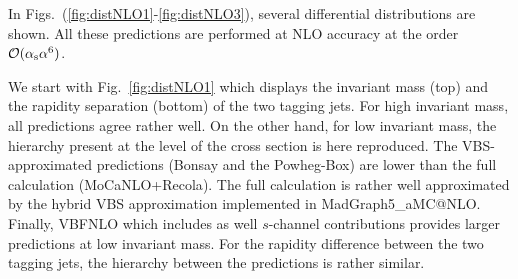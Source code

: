 In Figs.~(\ref{fig:distNLO1}-\ref{fig:distNLO3}), several differential distributions are shown.
All these predictions are performed at NLO accuracy at the order $\mathcal{O}(\alpha_{\rm s}\alpha^6)$.

We start with Fig.~\ref{fig:distNLO1} which displays the invariant mass (top) and the rapidity separation (bottom) of the two tagging jets.
For high invariant mass, all predictions agree rather well.
On the other hand, for low invariant mass, the hierarchy present at the level of the cross section is here reproduced.
The VBS-approximated predictions ({\sc Bonsay} and the {\sc Powheg-Box}) are lower than the full calculation ({\sc MoCaNLO}+{\sc Recola}).
The full calculation is rather well approximated by the hybrid VBS approximation implemented in {\sc MadGraph5\_aMC\-@NLO}.
Finally, {\sc VBFNLO} which includes as well $s$-channel contributions provides larger predictions at low invariant mass.
For the rapidity difference between the two tagging jets, the hierarchy between the predictions is rather similar.

